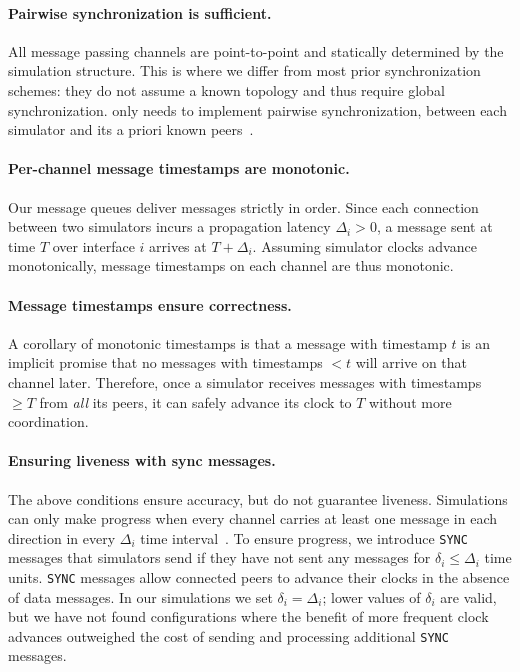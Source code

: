\paragraph{Pairwise synchronization is sufficient.}
All \sysname message passing channels are point-to-point and
statically determined by the simulation structure.
%
This is where we differ from most prior synchronization schemes:
they do not assume a known topology and thus require global
synchronization.
%
\sysname only needs to implement pairwise synchronization, between each
simulator and its a priori known peers~\cite{bryant:distsim}.

\paragraph{Per-channel message timestamps are monotonic.}
Our message queues deliver messages strictly in order.
%
Since each \sysname connection between two simulators incurs a
propagation latency $\Delta_i > 0$, a message sent at time
$T$ over interface $i$ arrives at $T + \Delta_i$.
%
Assuming simulator clocks advance monotonically,
message timestamps on each channel are thus monotonic.

\paragraph{Message timestamps ensure correctness.}
A corollary of monotonic timestamps is that
a message with timestamp $t$ is an implicit promise that no
messages with timestamps $<t$ will arrive on that channel later.
%
Therefore, once a simulator receives messages with timestamps
$\ge T$ from \emph{all} its peers, it can safely advance
its clock to $T$ without more coordination.



\paragraph{Ensuring liveness with sync messages.}
The above conditions ensure accuracy, but do not guarantee liveness.
%
Simulations can only make progress when every channel carries at
least one message in each direction in every $\Delta_i$ time
interval~\cite{chandy:distsim,bryant:distsim}.
%
To ensure progress, we introduce \texttt{SYNC} messages that
simulators send if they have not sent any messages for
$\delta_i \le \Delta_i$ time units.
%
\texttt{SYNC} messages allow connected peers to advance their clocks in the
absence of data messages.
%
In our simulations we set $\delta_i = \Delta_i$;
%
lower values of $\delta_i$ are valid, but we have not found
configurations where the benefit of more frequent clock advances
outweighed the cost of sending and processing additional
\texttt{SYNC} messages.

